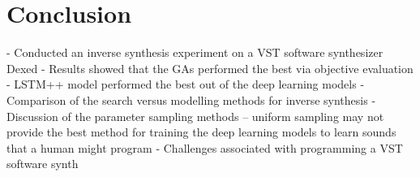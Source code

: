 
\section{Conclusion}

- Conducted an inverse synthesis experiment on a VST software synthesizer Dexed
- Results showed that the GAs performed the best via objective evaluation
- LSTM++ model performed the best out of the deep learning models
- Comparison of the search versus modelling methods for inverse synthesis
- Discussion of the parameter sampling methods -- uniform sampling may not provide the best method for training the deep learning models to learn sounds that a human might program
- Challenges associated with programming a VST software synth